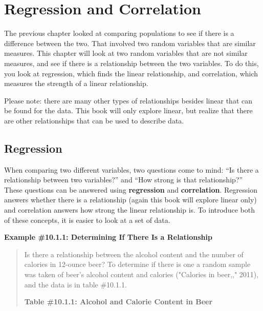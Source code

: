\documentclass[]{book}
\begin{document}
\hypertarget{regression-and-correlation}{%
\chapter{Regression and Correlation}\label{regression-and-correlation}}

The previous chapter looked at comparing populations to see if there is a difference between the two. That involved two random variables that are similar measures. This chapter will look at two random variables that are not similar measures, and see if there is a relationship between the two variables. To do this, you look at regression, which finds the linear relationship, and correlation, which measures the strength of a linear relationship.

Please note: there are many other types of relationships besides linear that can be found for the data. This book will only explore linear, but realize that there are other relationships that can be used to describe data.

\hypertarget{regression}{%
\section{Regression}\label{regression}}

When comparing two different variables, two questions come to mind: ``Is there a relationship between two variables?'' and ``How strong is that relationship?'' These questions can be answered using \textbf{regression} and \textbf{correlation}. Regression answers whether there is a relationship (again this book will explore linear only) and correlation answers how strong the linear relationship is. To introduce both of these concepts, it is easier to look at a set of data.

\textbf{Example \#10.1.1: Determining If There Is a Relationship}

\begin{quote}
Is there a relationship between the alcohol content and the number of calories in 12-ounce beer? To determine if there is one a random sample was taken of beer's alcohol content and calories ("Calories in beer,," 2011), and the data is in table \#10.1.1.

\textbf{Table \#10.1.1: Alcohol and Calorie Content in Beer}
\end{quote}
\end{document}
